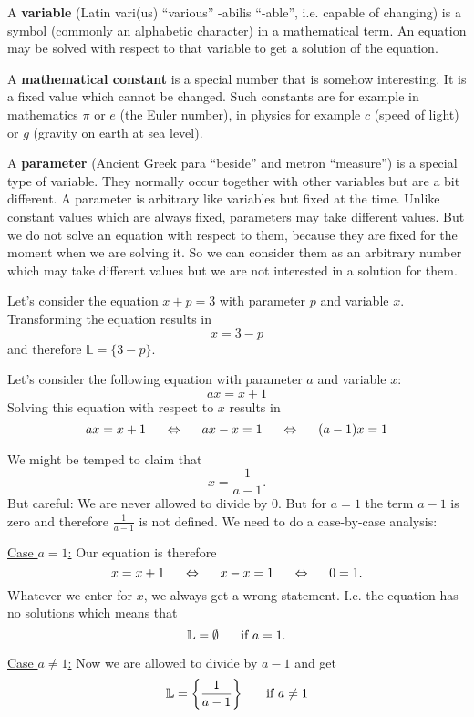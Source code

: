 \begin{tcolorbox}[colback=white]
\begin{definition}
$ $

A \textbf{variable} (Latin vari(us) ``various'' -abilis ``-able'', i.e. capable of changing) is a symbol (commonly an alphabetic character) in a mathematical term. An equation may be solved with respect to that variable to get a solution of the equation.  
\vsp

A \textbf{mathematical constant} is a special number that is somehow interesting. It is a fixed value which cannot be changed. Such constants are for example in mathematics $\pi$ or $e$ (the Euler number), in physics for example $c$ (speed of light) or $g$ (gravity on earth at sea level). 
\vsp

A \textbf{parameter} (Ancient Greek para ``beside'' and metron ``measure'') is a special type of variable. They normally occur together with other variables but are a bit different. A parameter is arbitrary like variables but fixed at the time. Unlike constant values which are always fixed, parameters may take different values. But we do not solve an equation with respect to them, because they are fixed for the moment when we are solving it. So we can consider them as an arbitrary number which may take different values but we are not interested in a solution for them. 
\end{definition}
\end{tcolorbox}


\begin{example}

Let's consider the equation $x+p=3$ with parameter $p$ and variable $x$. Transforming the equation results in
\[
x=3-p
\]
and therefore $\mathbb{L}=\{3-p\}$. 

\end{example}
\vfill

\begin{example}
Let's consider the following equation with parameter $a$ and variable $x$:
\[
ax=x+1
\]
Solving this equation with respect to $x$ results in
\[
ax=x+1 \hspace{5mm}\Leftrightarrow\hspace{5mm} ax-x=1 \hspace{5mm} \Leftrightarrow \hspace{5mm} (a-1)x=1
\]

We might be temped to claim that 
\[
x=\frac{1}{a-1}.
\]
But careful: We are never allowed to divide by $0$. But for $a=1$ the term $a-1$ is zero and therefore $\frac{1}{a-1}$ is not defined. We need to do a case-by-case analysis:\vsp

\underline{Case $a=1$:} Our equation is therefore
\[
x=x+1 \hspace{5mm}\Leftrightarrow\hspace{5mm} x-x=1 \hspace{5mm}\Leftrightarrow\hspace{5mm} 0=1.
\]
Whatever we enter for $x$, we always get a wrong statement. I.e. the equation has no solutions which means that 
\[
\mathbb{L}=\emptyset \hspace{5mm}\text{ if $a=1$}.
\]

\underline{Case $a\neq 1$:} Now we are allowed to divide by $a-1$ and get 
\[
\mathbb{L}=\left\{\frac{1}{a-1}\right\} \hspace{5mm}\text{ if $a\neq 1$}
\]

\end{example}
\vfill

